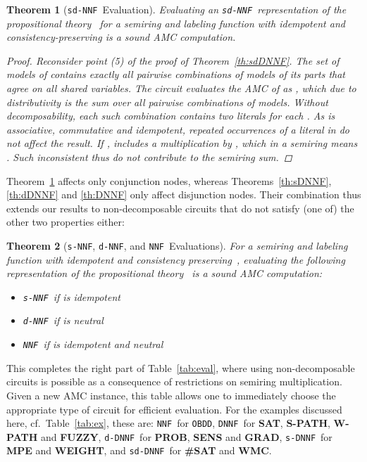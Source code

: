 \documentclass{article}
\theoremstyle{plain}
\newtheorem{theorem}{Theorem}
\theoremstyle{definition}
\newcommand{\NNF}{{\tt NNF}}
\newcommand{\dNNF}{{\tt d-NNF}}
\newcommand{\sNNF}{{\tt s-NNF}}
\newcommand{\DNNF}{{\tt DNNF}}
\newcommand{\dDNNF}{{\tt d-DNNF}}
\newcommand{\sDNNF}{{\tt s-DNNF}}
\newcommand{\sdDNNF}{{\tt sd-DNNF}}
\newcommand{\sdNNF}{{\tt sd-NNF}}
\newcommand{\OBDDo}{{\tt OBDD}}
\begin{document}
\begin{theorem}[\sdNNF\ Evaluation]\label{th:sdNNF}
 Evaluating an \sdNNF\ representation of the propositional theory~
 for a semiring and labeling function with  idempotent and
  consistency-preserving  is a sound AMC computation.
 \begin{proof}
 Reconsider point (5) of the proof of Theorem~\ref{th:sdDNNF}.
The set of models of   contains exactly all
pairwise combinations of models of its parts that agree on all shared variables.
The circuit evaluates the AMC of   as
, which due to distributivity is the
sum over all pairwise combinations of models. Without
decomposability, each such combination  contains two literals for each . As  is associative, commutative
and idempotent, repeated occurrences of a literal  in
 do not affect the result. If ,  includes a multiplication by
, which in a semiring
means . Such inconsistent  thus  do not
contribute to the semiring sum.
 \end{proof}
\end{theorem}
Theorem~\ref{th:sdNNF} affects only conjunction nodes, whereas
Theorems~\ref{th:sDNNF}, \ref{th:dDNNF} and \ref{th:DNNF} only affect
disjunction nodes. Their combination thus extends our results to 
non-decomposable circuits that do not satisfy (one of) the other two properties either:
\begin{theorem}[\sNNF, \dNNF, and \NNF\ Evaluations]\label{th:NNF}
 For a semiring and labeling function with idempotent and
  consistency preserving~, evaluating the following representation of the propositional theory~
  is a sound AMC computation:
\begin{itemize}
\item \sNNF\ if  is idempotent
\item \dNNF\ if  is neutral
\item \NNF\ if  is idempotent and neutral
\end{itemize}
\end{theorem}

This completes the right part of Table~\ref{tab:eval}, where using non-decomposable circuits is possible as a consequence of
restrictions on semiring multiplication. 
Given a new AMC instance, this table allows one  to immediately
choose the appropriate type of circuit for efficient
evaluation. For the examples discussed here, cf.~Table~\ref{tab:ex}, these are: \NNF\
for \OBDDo, \DNNF\ for  \textbf{SAT}, \textbf{S-PATH}, \textbf{W-PATH}
and \textbf{FUZZY}, \dDNNF\ for \textbf{PROB},
\textbf{SENS} and \textbf{GRAD}, \sDNNF\ for \textbf{MPE} and 
\textbf{WEIGHT}, and \sdDNNF\ for \textbf{\#SAT} and \textbf{WMC}. 
\end{document}
